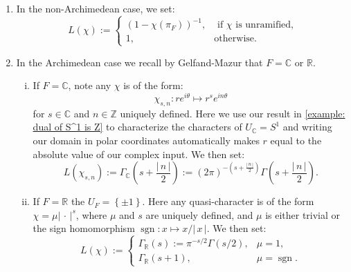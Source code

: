 \documentclass[11pt, x11names, openany]{book}
\newcommand{\zz}{\mathbb{Z}}
\newcommand{\rr}{\mathbb{R}}
\newcommand{\cc}{\mathbb{C}}
\newcommand{\set}[1]{\left\{ #1 \right\}}
\renewcommand{\brack}[1]{\left(   #1 \right)}
\newcommand{\abs}[1]{\left| \, #1  \,\right|}
\DeclareMathOperator{\sgn}{sgn}
\newcommand{\inv}[1]{#1^{-1}}
\begin{document}
\begin{enumerate}[(1)]
    \item In the non-Archimedean case, we set:
    \begin{equation}
        \label{eqn: non-Arch local L-factor}
        L(\chi) := \begin{cases}
            \inv{\brack{1 - \chi(\pi_F)}}, & \text{ if } \chi \text{ is unramified,}\\
            1, & \text{otherwise}.
        \end{cases}
    \end{equation}
    \item In the Archimedean case we recall by Gelfand-Mazur that $F = \cc$ or $\rr$. 
    \begin{enumerate}[(i)]
        \item If $F = \cc$, note any $\chi$ is of the form:
        \begin{equation*}
            \chi_{s, n}: re^{i\theta} \mapsto r^s e^{i n \theta}
        \end{equation*}
         for $s \in \cc$ and $n \in \zz$ uniquely defined. Here we use our result in \ref{example: dual of S^1 is Z} to characterize the characters of $U_\cc = S^1$ and writing our domain in polar coordinates automatically makes $r$ equal to the absolute value of our complex input. We then set:
         \begin{equation}
        \label{eqn: complex local L-factor}
            L(\chi_{s, n}) := \Gamma_\cc(s + \frac{\abs{n}}{2}) := \brack{2 \pi}^{-\brack{s + \frac{\abs{n}}{2}}}\Gamma(s + \frac{\abs{n}}{2}).
         \end{equation} 
         \item If $F = \rr$ the $U_F = \set{\pm 1}$. Here any quasi-character is of the form $\chi = \mu \abs{\cdot}^s$, where $\mu$ and $s$ are uniquely defined, and $\mu$ is either trivial or the sign homomorphism $\sgn: x \mapsto x/\abs{x}$. We then set:
         \begin{equation}
        \label{eqn: real local L-factor}
             L(\chi) := \begin{cases}
                 \Gamma_\rr(s) := \pi^{-s/2}\Gamma(s/2), & \mu = 1,\\
                 \Gamma_\rr(s+1), & \mu = \sgn.
             \end{cases}
         \end{equation}
    \end{enumerate}
\end{enumerate}
\end{document}

